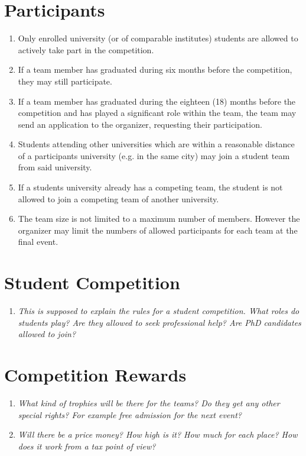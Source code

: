     \section{Participants}
    \begin{enumerate}
      \item Only enrolled university (or of comparable institutes) students are allowed to actively take part in the competition.
      \item If a team member has graduated during six months before the competition, they may still participate.
      \item If a team member has graduated during the eighteen (18) months before the competition and has played a significant role within the team,
      the team may send an application to the organizer, requesting their participation. 
      \item Students attending other universities which are within a reasonable distance of a participants university (e.g. in the same city) may join
      a student team from said university.
      \item If a students university already has a competing team, the student is not allowed to join a competing team of 
      another university.  
      \item The team size is not limited to a maximum number of members. However the organizer may limit the numbers of allowed participants for each team at the final event. 
    \end{enumerate}

    \section{Student Competition}
    \begin{enumerate}
      \item \emph{This is supposed to explain the rules for a student competition. What roles do students play? 
      Are they allowed to seek professional help? Are PhD candidates allowed to join?}
    \end{enumerate}

    \section{Competition Rewards}
    \begin{enumerate}
      \item \emph{What kind of trophies will be there for the teams? Do they get any other special rights? For example free admission for the next event?}
      \item \emph{Will there be a price money? How high is it? How much for each place? How does it work from a tax point of view?  }
    \end{enumerate}





